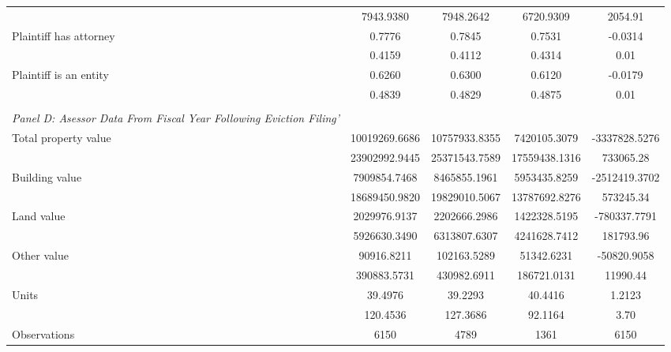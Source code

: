 {\begin{tabular}{l*{4}{c}}
                    &  7943.9380 &  7948.2642 &  6720.9309 &     2054.91\\
\hspace{0.25cm}Plaintiff has attorney&     0.7776 &     0.7845 &     0.7531 &     -0.0314\\
                    &     0.4159 &     0.4112 &     0.4314 &        0.01\\
\hspace{0.25cm}Plaintiff is an entity&     0.6260 &     0.6300 &     0.6120 &     -0.0179\\
                    &     0.4839 &     0.4829 &     0.4875 &        0.01\\
\vspace{0.1em} \\ \emph{Panel D: Asessor Data From Fiscal Year Following Eviction Filing'}&            &            &            &            \\
\hspace{0.25cm}Total property value&10019269.6686 &10757933.8355 &7420105.3079 & -3337828.5276\\
                    &23902992.9445 &25371543.7589 &17559438.1316 &   733065.28\\
\hspace{0.25cm}Building value&7909854.7468 &8465855.1961 &5953435.8259 & -2512419.3702\\
                    &18689450.9820 &19829010.5067 &13787692.8276 &   573245.34\\
\hspace{0.25cm}Land value&2029976.9137 &2202666.2986 &1422328.5195 & -780337.7791\\
                    &5926630.3490 &6313807.6307 &4241628.7412 &   181793.96\\
\hspace{0.25cm}Other value& 90916.8211 &102163.5289 & 51342.6231 & -50820.9058\\
                    &390883.5731 &430982.6911 &186721.0131 &    11990.44\\
\hspace{0.25cm}Units&    39.4976 &    39.2293 &    40.4416 &      1.2123\\
                    &   120.4536 &   127.3686 &    92.1164 &        3.70\\
\midrule
Observations        &        6150&        4789&        1361&        6150\\
\bottomrule
\end{tabular}
}
